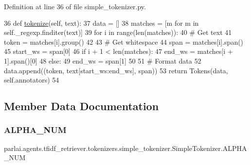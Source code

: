 Definition at line 36 of file simple\+\_\+tokenizer.\+py.


\begin{DoxyCode}
36     \textcolor{keyword}{def }\hyperlink{namespaceparlai_1_1agents_1_1tfidf__retriever_1_1build__tfidf_a1fdb457e98eb4e4c26047e229686a616}{tokenize}(self, text):
37         data = []
38         matches = [m \textcolor{keywordflow}{for} m \textcolor{keywordflow}{in} self.\_regexp.finditer(text)]
39         \textcolor{keywordflow}{for} i \textcolor{keywordflow}{in} range(len(matches)):
40             \textcolor{comment}{# Get text}
41             token = matches[i].group()
42 
43             \textcolor{comment}{# Get whitespace}
44             span = matches[i].span()
45             start\_ws = span[0]
46             \textcolor{keywordflow}{if} i + 1 < len(matches):
47                 end\_ws = matches[i + 1].span()[0]
48             \textcolor{keywordflow}{else}:
49                 end\_ws = span[1]
50 
51             \textcolor{comment}{# Format data}
52             data.append((token, text[start\_ws:end\_ws], span))
53         \textcolor{keywordflow}{return} Tokens(data, self.annotators)
54 \end{DoxyCode}


\subsection{Member Data Documentation}
\mbox{\label{classparlai_1_1agents_1_1tfidf__retriever_1_1tokenizers_1_1simple__tokenizer_1_1SimpleTokenizer_aa6fcedf1435823fe5d79b8c73e769158}} 
\subsubsection{\texorpdfstring{A\+L\+P\+H\+A\+\_\+\+N\+UM}{ALPHA\_NUM}}
{\footnotesize\ttfamily parlai.\+agents.\+tfidf\+\_\+retriever.\+tokenizers.\+simple\+\_\+tokenizer.\+Simple\+Tokenizer.\+A\+L\+P\+H\+A\+\_\+\+N\+UM\hspace{0.3cm}{\ttfamily [static]}}



